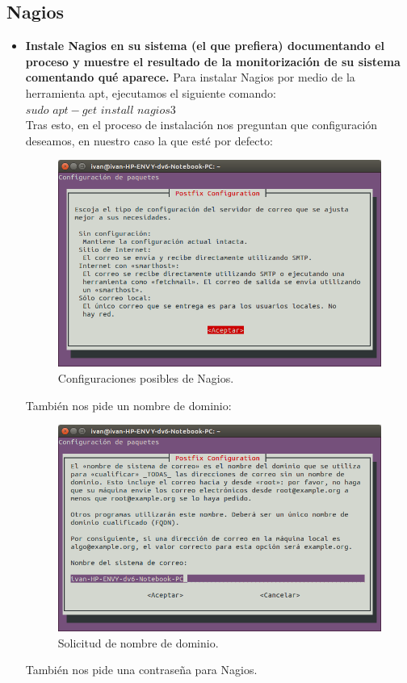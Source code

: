 \subsection{Nagios}
\begin{itemize}
	\item \textbf{Instale Nagios en su sistema (el que prefiera) documentando el
		proceso y muestre el resultado de la monitorización de su sistema comentando qué
		aparece.}
	Para instalar Nagios por medio de la herramienta apt, ejecutamos el siguiente comando:\\
	
	$sudo$ $apt-get$ $install$ $nagios3$\\
	
	Tras esto, en el proceso de instalación nos preguntan que configuración deseamos, en nuestro caso la que esté por defecto:\\
	\begin{figure}[H]
	\centering
	\includegraphics[width=0.7\linewidth]{Nagios1}
	\caption[Configuración]{Configuraciones posibles de Nagios.}
	\label{fig:Nagios1}
	\end{figure}
	
	También nos pide un nombre de dominio:\\
	\begin{figure}[H]
	\centering
	\includegraphics[width=0.7\linewidth]{Nagios2}
	\caption[nagios2]{Solicitud de nombre de dominio.}
	\label{fig:Nagios2}
	\end{figure}
	
	También nos pide una contraseña para Nagios.
	
\end{itemize}

